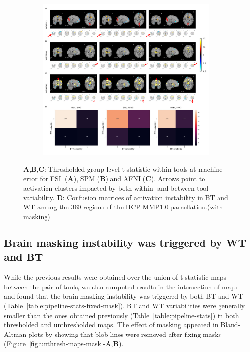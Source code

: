 \begin{figure}[ht]
  \begin{subfigure}[ht]{\textwidth}
    \centering
    \includegraphics[width=\textwidth]{chapters/chapter3/figures/act_deact-marked.pdf}
  \end{subfigure}
  \centering
  \caption{\textbf{A},\textbf{B},\textbf{C}: Thresholded group-level
    t-statistic within tools at machine error for FSL (\textbf{A}), SPM
    (\textbf{B}) and AFNI (\textbf{C}). Arrows point to activation clusters
    impacted by both within- and between-tool variability.
     \textbf{D}: Confusion matrices of
    activation instability in BT and WT among the 360 regions of the
    HCP-MMP1.0 parcellation.(with masking)}
  \label{fig:thresh-maps}
\end{figure}

\subsection{Brain masking instability was triggered by WT and BT}

While the previous results were obtained over the union of t-statistic maps between the pair of tools,
we also computed results in the intersection of maps and found that the brain masking instability was
triggered by both BT and WT (Table~\ref{table:pipeline-stats-fixed-mask}).
BT and WT variabilities were generally smaller than the ones obtained previously (Table~\ref{table:pipeline-stats})
in both thresholded and unthresholded maps.
The effect of masking appeared in Bland-Altman plots by showing that blob lines
were removed after fixing masks (Figure~\ref{fig:unthresh-maps-mask}-\textbf{A},\textbf{B}).

